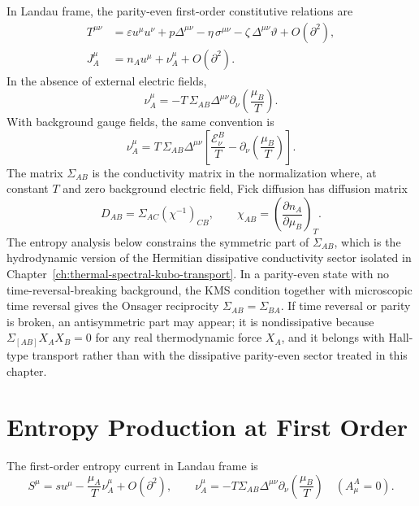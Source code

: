 In Landau frame, the parity-even first-order constitutive relations are
\begin{align}
  T^{\mu\nu}
  &=
  \varepsilon u^\mu u^\nu
  +p\Delta^{\mu\nu}
  -\eta\,\sigma^{\mu\nu}
  -\zeta\,\Delta^{\mu\nu}\vartheta
  +O(\partial^2),
  \label{eq:hydro-first-order-stress}\\
  J_A^\mu
  &=
  n_Au^\mu
  +\nu_A^\mu
  +O(\partial^2).
  \label{eq:hydro-first-order-current}
\end{align}
In the absence of external electric fields,
\begin{equation}
  \nu_A^\mu
  =
  -T\,\Sigma_{AB}\Delta^{\mu\nu}
  \partial_\nu\!\left(\frac{\mu_B}{T}\right).
  \label{eq:hydro-first-order-current-sourcefree}
\end{equation}
With background gauge fields, the same convention is
\begin{equation}
  \nu_A^\mu
  =
  T\,\Sigma_{AB}\Delta^{\mu\nu}
  \left[
    \frac{\mathcal E^B_\nu}{T}
    -\partial_\nu\!\left(\frac{\mu_B}{T}\right)
  \right].
  \label{eq:hydro-first-order-current-sourceful}
\end{equation}
The matrix \(\Sigma_{AB}\) is the conductivity matrix in the normalization
where, at constant \(T\) and zero background electric field, Fick diffusion
has diffusion matrix
\[
  D_{AB}=\Sigma_{AC}(\chi^{-1})_{CB},
  \qquad
  \chi_{AB}=\left(\frac{\partial n_A}{\partial\mu_B}\right)_T .
\]
The entropy analysis below constrains the symmetric part of \(\Sigma_{AB}\),
which is the hydrodynamic version of the Hermitian dissipative conductivity
sector isolated in Chapter~\ref{ch:thermal-spectral-kubo-transport}.
In a parity-even state with no time-reversal-breaking background, the KMS
condition together with microscopic time reversal gives the Onsager
reciprocity \(\Sigma_{AB}=\Sigma_{BA}\).  If time reversal or parity is
broken, an antisymmetric part may appear; it is nondissipative because
\(\Sigma_{[AB]}X_A X_B=0\) for any real thermodynamic force \(X_A\), and it
belongs with Hall-type transport rather than with the dissipative
parity-even sector treated in this chapter.

\section{Entropy Production at First Order}

The first-order entropy current in Landau frame is
\begin{equation}
  S^\mu
  =
  s u^\mu-\frac{\mu_A}{T}\nu_A^\mu+O(\partial^2),
  \qquad
  \nu_A^\mu
  =
  -T\Sigma_{AB}\Delta^{\mu\nu}
  \partial_\nu\!\left(\frac{\mu_B}{T}\right)
  \quad(A^A_\mu=0).
  \label{eq:hydro-first-order-entropy-current}
\end{equation}

